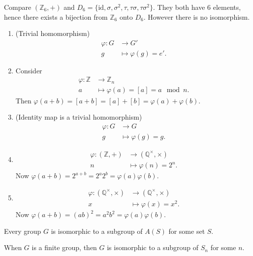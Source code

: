 \begin{nonexample}
 	Compare $\left( \mathbb{Z}_6, + \right) $ and $D_6 = \{\text{id}, \sigma, \sigma^2, \tau,\tau\sigma, \tau\sigma^2\} $. They both have 6 elements, hence there exists a bijection from $\mathbb{Z}_6$ onto $D_6$. However there is no isomorphism.
\end{nonexample}

\begin{example}
	\begin{enumerate}
		\item (Trivial homomorphism) 
			\begin{align*}
			\varphi: G &\longrightarrow G' \\
			g &\longmapsto \varphi(g) = e'
		.\end{align*}
	\item Consider 
		\begin{align*}
		\varphi: \mathbb{Z} &\longrightarrow \mathbb{Z}_n \\
		a &\longmapsto \varphi(a) = [a] = a \mod n
	.\end{align*}
	Then $\varphi(a+b) = [a+b]=[a]+[b] = \varphi(a)+\varphi(b)$.
	\item (Identity map is a trivial homomorphism) 
		\begin{align*}
			\varphi: G &\longrightarrow G \\
			g &\longmapsto \varphi(g) = g
		.\end{align*}
	\item 
		\begin{align*}
		\varphi: \left( \mathbb{Z}, + \right)  &\longrightarrow \left( \mathbb{Q}^\times , \times  \right)  \\
		n &\longmapsto \varphi(n) = 2^n
	.\end{align*}
	Now $\varphi(a+b) = 2^{a+b} = 2^a 2^b = \varphi(a)\varphi(b)$.

	\item 
		\begin{align*}
		\varphi: \left( \mathbb{Q}^\times , \times  \right)  &\longrightarrow \left( \mathbb{Q}^\times , \times  \right)  \\
		x &\longmapsto \varphi(x) = x^2
	.\end{align*}
	Now $\varphi(a+b) = (ab)^2 = a^2b^2 = \varphi(a)\varphi(b)$.
	\end{enumerate}
\end{example}

\begin{theorem}
	Every group $G$ is isomorphic to a subgroup of $A(S)$ for some set $S$.
\end{theorem}
\begin{corollary}
	When $G$ is a finite group, then $G$ is isomorphic to a subgroup of $S_n$ for some $n$.
\end{corollary}

